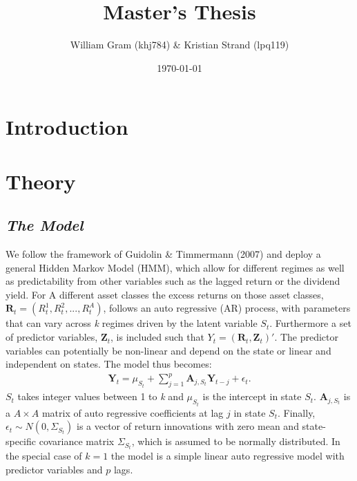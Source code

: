 \documentclass[11pt,a4paper,oneside]{article}
\title{Master's Thesis}
\author{William Gram (khj784) \& Kristian Strand (lpq119)}
\date{\today}
\newcommand{\aaa}{\mathbf{A}}
\newcommand{\rr}{\mathbf{R}}
\newcommand{\zz}{\mathbf{Z}}
\newcommand{\yy}{\mathbf{Y}}
\begin{document}
\maketitle

\newpage

\rfoot{\thepage}

\tableofcontents

\newpage

\setcounter{page}{1}

\section{Introduction}

\section{Theory}
\subsection{\textit{The Model}}
\noindent We follow the framework of Guidolin \& Timmermann (2007) \cite{2007} and deploy a general Hidden Markov Model (HMM), which allow for different regimes as well as predictability from other variables such as the lagged return or the dividend yield. For A different asset classes the excess returns on those asset classes, $\rr_t = (R_t^1,R_t^2,...,R_t^A)$, follows an auto regressive (AR) process, with parameters that can vary across \textit{k} regimes driven by the latent variable $S_t$. Furthermore a set of predictor variables, $\zz_t$, is included such that $Y_t=(\rr_t,\zz_t)'$. The predictor variables can potentially be non-linear and depend on the state or linear and independent on states. The model thus becomes:
\begin{align} \label{model}
    \yy_t = \mu_{S_t}+\sum_{j=1}^{p} \aaa_{j,S_t}\yy_{t-j}+\epsilon_t.
\end{align}
$S_t$ takes integer values between 1 to \textit{k} and $\mu_{S_t}$ is the intercept in state $S_t$. $\aaa_{j,S_t}$ is a $A \times A$ matrix of auto regressive coefficients at lag $j$ in state $S_t$. Finally,  $\epsilon_t \sim N(0,\Sigma_{S_t})$ is a vector of return innovations with zero mean and state-specific covariance matrix $\Sigma_{S_t}$, which is assumed to be normally distributed. In the special case of $k=1$ the model is a simple linear auto regressive model with predictor variables and $p$ lags.
\end{document}
